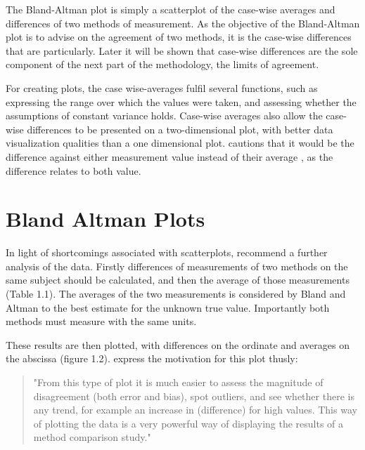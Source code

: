 \documentclass[Main.tex]{subfiles}
\begin{document}
	The Bland-Altman plot is simply a scatterplot of the case-wise
	averages and differences of two methods of measurement. As the
	objective of the Bland-Altman plot is to advise on the agreement
	of two methods, it is the case-wise differences that are
	particularly. Later it will be shown that case-wise differences
	are the sole component of the next part of the methodology, the
	limits of agreement.
	
	For creating plots, the case wise-averages fulfil several
	functions, such as expressing the range over which the values were
	taken, and assessing whether the assumptions of constant variance
	holds. Case-wise averages also allow the case-wise differences to
	be presented on a two-dimensional plot, with better data
	visualization qualities than a one dimensional plot. \citet{BA86}
	cautions that it would be the difference against either
	measurement value instead of their average , as the difference
	relates to both value.
	

	
	

	


	\section{Bland Altman Plots}


	
	
	In light of shortcomings associated with scatterplots,
	\citet*{BA83} recommend a further analysis of the data. Firstly
	differences of measurements of two methods on the same subject
	should  be calculated, and then the average of those measurements
	(Table 1.1). The averages of the two measurements is considered by
	Bland and Altman to the best estimate for the unknown true value.
	Importantly both methods must measure with the same units. 
	
	These
	results are then plotted, with differences on the ordinate and
	averages on the abscissa (figure 1.2). \citet*{BA83}express the
	motivation for this plot thusly:
	\begin{quote}
		"From this type of plot it is much easier to assess the magnitude
		of disagreement (both error and bias), spot outliers, and see
		whether there is any trend, for example an increase in
		(difference) for high values. This way of plotting the data is a
		very powerful way of displaying the results of a method comparison
		study."
	\end{quote}
		
\end{document}
